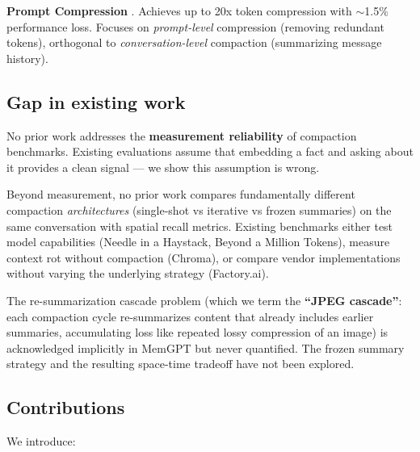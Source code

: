 \textbf{Prompt Compression} \citep{jiang2023llmlingua}. Achieves up to
20x token compression with $\sim$1.5\% performance loss. Focuses on \textit{prompt-level}
compression (removing redundant tokens), orthogonal to \textit{conversation-level}
compaction (summarizing message history).

\subsection{Gap in existing work}
\label{sec:gap}

No prior work addresses the \textbf{measurement reliability} of compaction
benchmarks. Existing evaluations assume that embedding a fact and asking about
it provides a clean signal --- we show this assumption is wrong.

Beyond measurement, no prior work compares fundamentally different compaction
\textit{architectures} (single-shot vs iterative vs frozen summaries) on the same
conversation with spatial recall metrics. Existing benchmarks either test model
capabilities (Needle in a Haystack, Beyond a Million Tokens), measure context
rot without compaction (Chroma), or compare vendor implementations without
varying the underlying strategy (Factory.ai).

The re-summarization cascade problem (which we term the \textbf{``JPEG cascade''}:
each compaction cycle re-summarizes content that already includes earlier
summaries, accumulating loss like repeated lossy compression of an image)
is acknowledged implicitly in MemGPT but never quantified. The frozen
summary strategy and the resulting space-time tradeoff have not been
explored.

\subsection{Contributions}
\label{sec:contributions}

We introduce:

